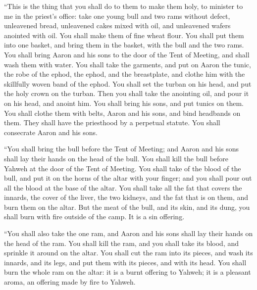  ``This is the thing that you shall do to them to make
them holy, to minister to me in the priest's office: take one young bull
and two rams without defect,  unleavened bread, unleavened
cakes mixed with oil, and unleavened wafers anointed with oil. You shall
make them of fine wheat flour.  You shall put them into
one basket, and bring them in the basket, with the bull and the two
rams.  You shall bring Aaron and his sons to the door of
the Tent of Meeting, and shall wash them with water.  You
shall take the garments, and put on Aaron the tunic, the robe of the
ephod, the ephod, and the breastplate, and clothe him with the
skillfully woven band of the ephod.  You shall set the
turban on his head, and put the holy crown on the turban. 
Then you shall take the anointing oil, and pour it on his head, and
anoint him.  You shall bring his sons, and put tunics on
them.  You shall clothe them with belts, Aaron and his
sons, and bind headbands on them. They shall have the priesthood by a
perpetual statute. You shall consecrate Aaron and his sons.

 ``You shall bring the bull before the Tent of Meeting;
and Aaron and his sons shall lay their hands on the head of the bull.
 You shall kill the bull before Yahweh at the door of the
Tent of Meeting.  You shall take of the blood of the
bull, and put it on the horns of the altar with your finger; and you
shall pour out all the blood at the base of the altar. 
You shall take all the fat that covers the innards, the cover of the
liver, the two kidneys, and the fat that is on them, and burn them on
the altar.  But the meat of the bull, and its skin, and
its dung, you shall burn with fire outside of the camp. It is a sin
offering.

 ``You shall also take the one ram, and Aaron and his
sons shall lay their hands on the head of the ram.  You
shall kill the ram, and you shall take its blood, and sprinkle it around
on the altar.  You shall cut the ram into its pieces, and
wash its innards, and its legs, and put them with its pieces, and with
its head.  You shall burn the whole ram on the altar: it
is a burnt offering to Yahweh; it is a pleasant aroma, an offering made
by fire to Yahweh.

